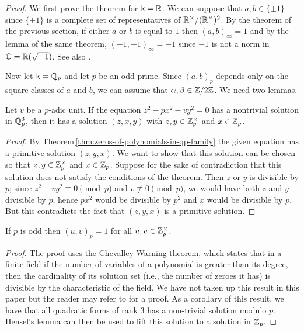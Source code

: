 \emph{Proof}. We first prove the theorem for \(\mathsf{k} = \mathbb{R}\). We can suppose that \(a, b \in \{\pm 1\}\) since \(\{\pm 1\}\) is a complete set of representatives of \(\mathbb{R}^{\times}/(\mathbb{R}^{\times})^2\). By the theorem of the previous section, if either \(a\) or \(b\) is equal to \(1\) then \((a, b)_{\infty} = 1\) and by the lemma of the same theorem, \((-1, -1)_{\infty} = -1\) since \(-1\) is not a norm in \(\mathbb{C} = \mathbb{R}(\sqrt{-1})\). See also \cite[Theorem~10.4]{sutherland2013introduction10}.

Now let \(\mathsf{k} = \mathbb{Q}_p\) and let \(p\) be an odd prime. Since \((a, b)_p\) depends only on the square classes of \(a\) and \(b\), we can assume that \(\alpha, \beta \in \mathbb{Z}/ 2\mathbb{Z}\). We need two lemmas.

\begin{lemmax}\label{lem:serre-sol-zp}
    {\normalfont\cite[p.~21]{serre2012course}}
    Let \(v\) be a \(p\)-adic unit. If the equation \(z^2 - px^2 - vy^2 = 0\) has a nontrivial solution in \(\mathbb{Q}_p^3\), then it has a solution \((z, x, y)\) with \(z, y \in \mathbb{Z}_p^{\times}\) and \(x \in \mathbb{Z}_p\).
\end{lemmax}

\begin{proof}
    By Theorem\,\ref{thm:zeros-of-polynomials-in-qp-family} the given equation has a primitive solution \((z, y, x)\). We want to show that this solution can be chosen so that \(z, y \in \mathbb{Z}_p^{\times}\) and \(x \in \mathbb{Z}_p\). Suppose for the sake of contradiction that this solution does not satisfy the conditions of the theorem. Then \(z\) or \(y\) is divisible by \(p\); since \(z^2 - vy^2 \equiv 0 \pmod{p}\) and \(v \not\equiv 0 \pmod{p}\), we would have both \(z\) and \(y\) divisible by \(p\), hence \(px^2\) would be divisible by \(p^2\) and \(x\) would be divisible by \(p\). But this contradicts the fact that \((z, y, x)\) is a primitive solution.
\end{proof}

\begin{lemmax}\label{lem:hilbert-odd-units}
    {\normalfont\cite[Lemma~10.5]{sutherland2013introduction10}}
    If \(p\) is odd then \((u, v)_p = 1\) for all \(u, v \in \mathbb{Z}_p^{\times}\).
\end{lemmax}

\begin{proof}
    The proof uses the Chevalley-Warning theorem, which states that in a finite field if the number of variables of a polynomial is greater than its degree, then the cardinality of its solution set (i.e., the number of zeroes it has) is divisible by the characteristic of the field. We have not taken up this result in this paper but the reader may refer to \cite[p.~5]{serre2012course} for a proof. As a corollary of this result, we have that all quadratic forms of rank \(3\) has a non-trivial solution modulo \(p\). Hensel's lemma can then be used to lift this solution to a solution in \(\mathbb{Z}_p\).
\end{proof}

